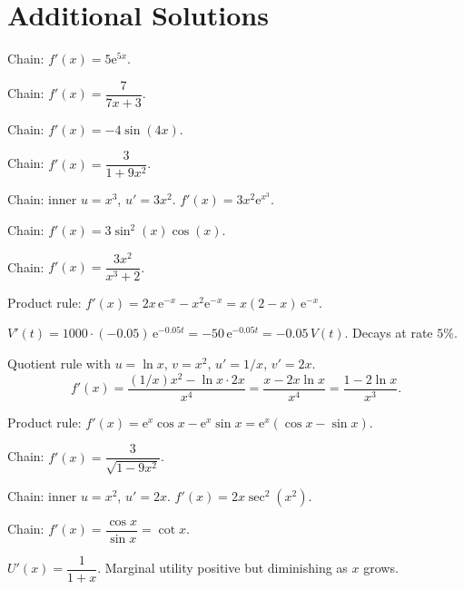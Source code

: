 \section{Additional Solutions}

\begin{solutions}
  \item Chain: $f'(x)=5\mathrm{e}^{5x}$.

  \item Chain: $f'(x)=\dfrac{7}{7x+3}$.

  \item Chain: $f'(x)=-4\sin(4x)$.

  \item Chain: $f'(x)=\dfrac{3}{1+9x^{2}}$.

  \item Chain: inner $u=x^{3}$, $u'=3x^{2}$. $f'(x)=3x^{2}\mathrm{e}^{x^{3}}$.

  \item Chain: $f'(x)=3\sin^{2}(x)\cos(x)$.

  \item Chain: $f'(x)=\dfrac{3x^{2}}{x^{3}+2}$.

  \item Product rule: $f'(x)=2x\,\mathrm{e}^{-x}-x^{2}\mathrm{e}^{-x}
        =x(2-x)\,\mathrm{e}^{-x}$.

  \item $V'(t)=1000\cdot(-0.05)\,\mathrm{e}^{-0.05t}=-50\,\mathrm{e}^{-0.05t}
        =-0.05\,V(t)$. Decays at rate $5\%$.

  \item Quotient rule with $u=\ln x$, $v=x^{2}$, $u'=1/x$, $v'=2x$.
        \[
          f'(x)=\frac{(1/x)x^{2}-\ln x\cdot 2x}{x^{4}}
               =\frac{x-2x\ln x}{x^{4}}=\frac{1-2\ln x}{x^{3}} .
        \]

  \item Product rule: $f'(x)=\mathrm{e}^{x}\cos x-\mathrm{e}^{x}\sin x
        =\mathrm{e}^{x}(\cos x-\sin x)$.

  \item Chain: $f'(x)=\dfrac{3}{\sqrt{1-9x^{2}}}$.

  \item Chain: inner $u=x^{2}$, $u'=2x$. $f'(x)=2x\sec^{2}(x^{2})$.

  \item Chain: $f'(x)=\dfrac{\cos x}{\sin x}=\cot x$.

  \item $U'(x)=\dfrac{1}{1+x}$. Marginal utility positive but diminishing
        as $x$ grows.


\end{solutions}
